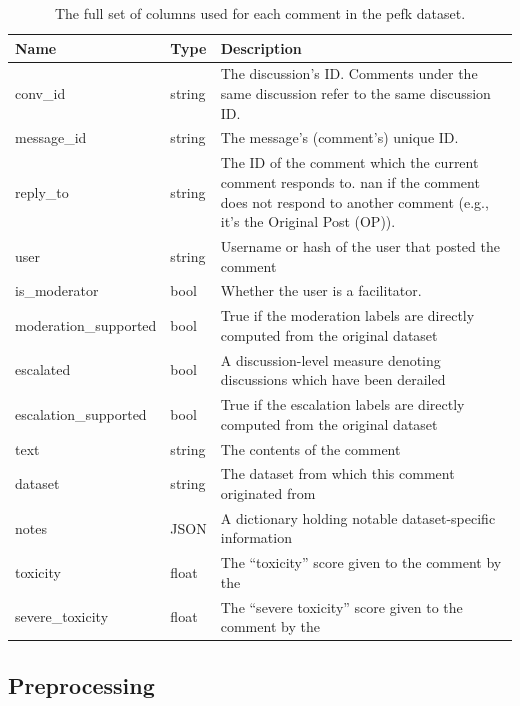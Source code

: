 \documentclass[11pt]{article}
\theoremstyle{definition}
\theoremstyle{plain}
\begin{document}
\begin{table}[t]
	\centering
	\begin{tabular}{llp{10cm}}
		\toprule
		\textbf{Name} & \textbf{Type} & \textbf{Description} \\
		\midrule
		conv\_id & string & The discussion's ID. Comments under the same discussion refer to the same discussion ID. \\
		message\_id & string & The message's (comment's) unique ID. \\
		reply\_to & string & The ID of the comment which the current comment responds to. nan if the comment does not respond to another comment (e.g., it's the Original Post (OP)). \\
		user & string & Username or hash of the user that posted the comment \\
		is\_moderator & bool & Whether the user is a facilitator. \\
		moderation\_supported & bool & True if the moderation labels are directly computed from the original dataset \\
		escalated & bool & A discussion-level measure denoting discussions which have been derailed \\
		escalation\_supported & bool & True if the escalation labels are directly computed from the original dataset \\
		text & string & The contents of the comment \\
		dataset & string & The dataset from which this comment originated from \\
		notes & JSON & A dictionary holding notable dataset-specific information \\
		toxicity & float & The ``toxicity'' score given to the comment by the \citet{google_perspective_api} \\
		severe\_toxicity & float & The ``severe toxicity'' score given to the comment by the \citet{google_perspective_api} \\
		\bottomrule
	\end{tabular}
	\caption{The full set of columns used for each comment in the \ac{pefk} dataset.}
	\label{tab:dataset-columns}
\end{table}


\subsection{Preprocessing}
\label{app:dataset:preprocessing}
\end{document}
